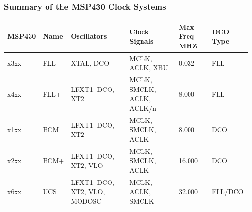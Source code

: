 \subsubsection{Summary of the MSP430 Clock Systems}
{\small 
\begin{tabular}{llllll}
    \textbf{MSP430}& \textbf{Name} & \textbf{Oscillators} & \textbf{Clock Signals} & \textbf{Max Freq MHZ} & \textbf{DCO Type} \\
    \hline
    x3xx           & FLL           & XTAL, DCO            & MCLK, ACLK, XBU        & 0.032                 & FLL                \\
    x4xx           & FLL+          & LFXT1, DCO, XT2      & MCLK, SMCLK, ACLK, ACLK/n  & 8.000             & FLL                \\
    x1xx           & BCM           & LFXT1, DCO, XT2      & MCLK, SMCLK, ACLK          & 8.000             & DCO                \\
    x2xx           & BCM+          & LFXT1, DCO, XT2, VLO & MCLK, SMCLK, ACLK          & 16.000            & DCO                \\
    x6xx           & UCS           & LFXT1, DCO, XT2, VLO, MODOSC & MCLK, ACLK, SMCLK  & 32.000            & FLL/DCO            \\
\end{tabular}
}

\clearpage
\pagebreak
